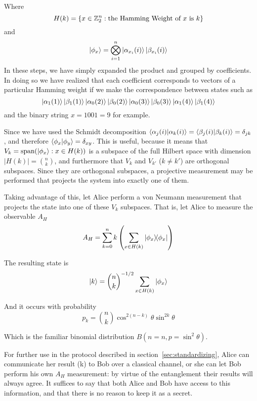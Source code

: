Where 
$$
H(k) = \left\{ 
x \in \mathbb{Z}_2^n : \text{the Hamming Weight of $x$ is $k$} 
\right\}
$$
and
$$
\ket{\phi_x} = \bigotimes_{i=1}^n 
\ket{\alpha_{x_i}(i)} \ket{\beta_{x_i}(i)}
$$
In these steps, we have simply expanded the product and grouped by coefficients. In doing so we have realized that each coefficient corresponds to vectors of a particular Hamming weight if we make the correspondence between states such as
$$\ket{\alpha_1(1)} \ket{\beta_1(1)} \ket{\alpha_0(2)} \ket{\beta_0(2)} \ket{\alpha_0(3)} \ket{\beta_0(3)} \ket{\alpha_1(4)} \ket{\beta_1(4)}$$
and the binary string $x = 1001 = 9$ for example.

Since we have used the Schmidt decomposition $ \braket{\alpha_j(i)}{\alpha_k(i)} = \braket{\beta_j(i)}{\beta_k(i)} = \delta_{jk} $, and therefore $\braket{\phi_x}{\phi_y} = \delta_{xy}$.
This is useful, because it means that $V_k = \text{span}(\ket{\phi_x} : x \in H(k))$ is a subspace of the full Hilbert space with dimension $|H(k)| = \binom{n}{k}$, and furthermore that $V_k$ and $V_{k'}$ ($k\neq k'$) are orthogonal subspaces.
Since they are orthogonal subspaces, a projective measurement may be performed that projects the system into exactly one of them.

Taking advantage of this, let Alice perform a von Neumann measurement that projects the state into one of these $V_k$ subspaces. That is, let Alice to measure the observable $A_H$
$$
A_H = \sum_{k=0}^n k \left( \sum_{x \in H(k)}  \dyad{\phi_x}{\phi_x} \right) 
$$

The resulting state is
\begin{equation}
\label{eqn:kstate}
\ket{k} = \binom{n}{k}^{-1/2} \sum_{x \in H(k)} \ket{\phi_x}
\end{equation}

And it occurs with probability
\begin{equation}
\label{eqn:pk}
p_k = \binom{n}{k} \cos^{2(n-k)}\theta \sin^{2k}\theta
\end{equation}

Which is the familiar binomial distribution $B(n=n, p=\sin^2\theta)$.

For further use in the protocol described in section~\ref{sec:standardizing}, Alice can communicate her result (k) to Bob over a classical channel, or she can let Bob perform his own $A_H$ measurement: by virtue of the entanglement their results will always agree. It suffices to say that both Alice and Bob have access to this information, and that there is no reason to keep it as a secret.

